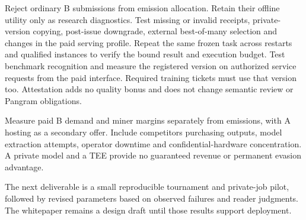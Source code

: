 Reject ordinary B submissions from emission allocation. Retain their
offline utility only as research diagnostics. Test missing or invalid
receipts, private-version copying, post-issue downgrade, external
best-of-many selection and changes in the paid serving profile.
Repeat the same frozen task across restarts and qualified instances to
verify the bound result and execution budget. Test benchmark recognition
and measure the registered version on authorized service requests from
the paid interface. Required training tickets must use that version too.
Attestation adds no quality bonus and does not change semantic review
or Pangram obligations.

Measure paid B demand and miner margins separately from emissions, with
A hosting as a secondary offer. Include competitors purchasing outputs,
model extraction attempts, operator downtime and confidential-hardware
concentration. A private model and a TEE provide no guaranteed revenue or
permanent evasion advantage.

The next deliverable is a small reproducible tournament and private-job
pilot, followed by revised parameters based on observed failures and
reader judgments. The whitepaper remains a design draft until those
results support deployment.
